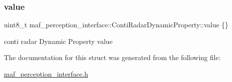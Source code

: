 \subsubsection{\texorpdfstring{value}{value}}
{\footnotesize\ttfamily uint8\+\_\+t maf\+\_\+perception\+\_\+interface\+::\+Conti\+Radar\+Dynamic\+Property\+::value \{\}}



conti radar Dynamic Property value 



The documentation for this struct was generated from the following file\+:\begin{DoxyCompactItemize}
\item 
\hyperlink{maf__perception__interface_8h}{maf\+\_\+perception\+\_\+interface.\+h}\end{DoxyCompactItemize}
